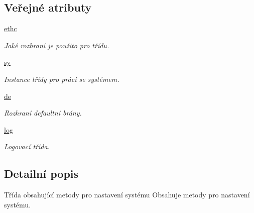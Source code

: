\subsection*{Veřejné atributy}
\begin{DoxyCompactItemize}
\item 
\hypertarget{classConfSys_1_1ConfSys_a3891a67e1d17ca6f09fdce5900814744}{\hyperlink{classConfSys_1_1ConfSys_a3891a67e1d17ca6f09fdce5900814744}{ethc}}\label{d0/d38/classConfSys_1_1ConfSys_a3891a67e1d17ca6f09fdce5900814744}

\begin{DoxyCompactList}\small\item\em Jaké rozhraní je použito pro třídu. \end{DoxyCompactList}\item 
\hypertarget{classConfSys_1_1ConfSys_a2af86ea0867572d5198dcf34487956cb}{\hyperlink{classConfSys_1_1ConfSys_a2af86ea0867572d5198dcf34487956cb}{sy}}\label{d0/d38/classConfSys_1_1ConfSys_a2af86ea0867572d5198dcf34487956cb}

\begin{DoxyCompactList}\small\item\em Instance třídy pro práci se systémem. \end{DoxyCompactList}\item 
\hypertarget{classConfSys_1_1ConfSys_aa15e4de0e14964b1c7c0c39eb70f4d0d}{\hyperlink{classConfSys_1_1ConfSys_aa15e4de0e14964b1c7c0c39eb70f4d0d}{de}}\label{d0/d38/classConfSys_1_1ConfSys_aa15e4de0e14964b1c7c0c39eb70f4d0d}

\begin{DoxyCompactList}\small\item\em Rozhraní defaultní brány. \end{DoxyCompactList}\item 
\hypertarget{classConfSys_1_1ConfSys_a0e588aeaddcbe3c98a1128c6865d4839}{\hyperlink{classConfSys_1_1ConfSys_a0e588aeaddcbe3c98a1128c6865d4839}{log}}\label{d0/d38/classConfSys_1_1ConfSys_a0e588aeaddcbe3c98a1128c6865d4839}

\begin{DoxyCompactList}\small\item\em Logovací třída. \end{DoxyCompactList}\end{DoxyCompactItemize}


\subsection{Detailní popis}
Třída obsahující metody pro nastavení systému Obsahuje metody pro nastavení systému. 

